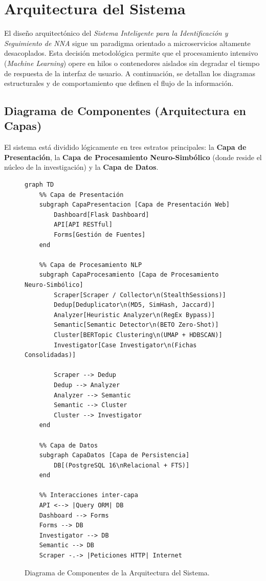 
\section{Arquitectura del Sistema}
\label{sec:arquitectura}

El diseño arquitectónico del \textit{Sistema Inteligente para la Identificación y Seguimiento de NNA} sigue un paradigma orientado a microservicios altamente desacoplados. Esta decisión metodológica permite que el procesamiento intensivo (\textit{Machine Learning}) opere en hilos o contenedores aislados sin degradar el tiempo de respuesta de la interfaz de usuario. A continuación, se detallan los diagramas estructurales y de comportamiento que definen el flujo de la información.

\subsection{Diagrama de Componentes (Arquitectura en Capas)}
\label{subsec:diagrama_componentes}

El sistema está dividido lógicamente en tres estratos principales: la \textbf{Capa de Presentación}, la \textbf{Capa de Procesamiento Neuro-Simbólico} (donde reside el núcleo de la investigación) y la \textbf{Capa de Datos}.

\begin{figure}[htbp]
    \centering
\begin{verbatim}
graph TD
    %% Capa de Presentación
    subgraph CapaPresentacion [Capa de Presentación Web]
        Dashboard[Flask Dashboard]
        API[API RESTful]
        Forms[Gestión de Fuentes]
    end

    %% Capa de Procesamiento NLP
    subgraph CapaProcesamiento [Capa de Procesamiento Neuro-Simbólico]
        Scraper[Scraper / Collector\n(StealthSessions)]
        Dedup[Deduplicator\n(MD5, SimHash, Jaccard)]
        Analyzer[Heuristic Analyzer\n(RegEx Bypass)]
        Semantic[Semantic Detector\n(BETO Zero-Shot)]
        Cluster[BERTopic Clustering\n(UMAP + HDBSCAN)]
        Investigator[Case Investigator\n(Fichas Consolidadas)]
        
        Scraper --> Dedup
        Dedup --> Analyzer
        Analyzer --> Semantic
        Semantic --> Cluster
        Cluster --> Investigator
    end

    %% Capa de Datos
    subgraph CapaDatos [Capa de Persistencia]
        DB[(PostgreSQL 16\nRelacional + FTS)]
    end

    %% Interacciones inter-capa
    API <--> |Query ORM| DB
    Dashboard --> Forms
    Forms --> DB
    Investigator --> DB
    Semantic --> DB
    Scraper -.-> |Peticiones HTTP| Internet
\end{verbatim}
    \caption{Diagrama de Componentes de la Arquitectura del Sistema.}
    \label{fig:diagrama_componentes}
\end{figure}

